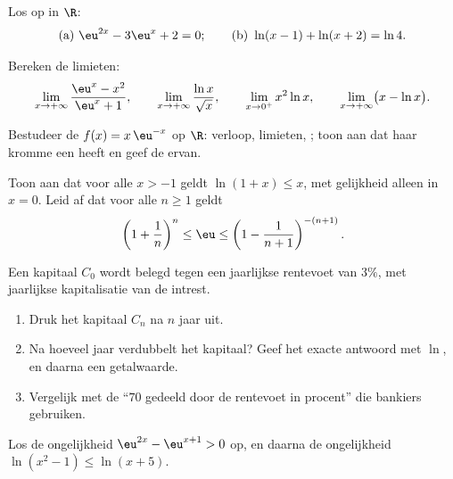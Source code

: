 \begin{exercise}[$\star$]\label{exo:g12:exp:2}
Los op in $\R$:
\[
\text{(a) } \eu^{2x} - 3\eu^{x} + 2 = 0;
\qquad
\text{(b) } \ln(x - 1) + \ln(x + 2) = \ln 4 .
\]
\end{exercise}

\begin{exercise}[$\star$]\label{exo:g12:exp:3}
Bereken de limieten:
\[
\lim_{x\to+\infty} \frac{\eu^x - x^2}{\eu^x + 1}, \qquad
\lim_{x\to+\infty} \frac{\ln x}{\sqrt x}, \qquad
\lim_{x\to0^+} x^2 \ln x, \qquad
\lim_{x\to+\infty} \bigl(x - \ln x\bigr).
\]
\end{exercise}

\begin{exercise}[$\star\star$]\label{exo:g12:exp:4}
Bestudeer de  $f(x) = x\,\eu^{-x}$ op $\R$: verloop, limieten,
; toon aan dat haar kromme een  heeft en geef de 
ervan.
\end{exercise}

\begin{exercise}[$\star\star$]\label{exo:g12:exp:5}
Toon aan dat voor alle $x > -1$ geldt $\ln(1 + x) \leq x$, met gelijkheid
alleen in $x = 0$. Leid af dat voor alle $n \geq 1$ geldt
\[
\left(1 + \frac{1}{n}\right)^n \leq \eu \leq \left(1 - \frac{1}{n+1}\right)^{-(n+1)} .
\]
\end{exercise}

\begin{exercise}[$\star\star$]\label{exo:g12:exp:6}
Een kapitaal $C_0$ wordt belegd tegen een jaarlijkse rentevoet van $3\%$, met
jaarlijkse kapitalisatie van de intrest.
\begin{enumerate}
  \item Druk het kapitaal $C_n$ na $n$ jaar uit.
  \item Na hoeveel jaar verdubbelt het kapitaal? Geef het exacte antwoord met
        $\ln$, en daarna een getalwaarde.
  \item Vergelijk met de  ``$70$ gedeeld door de rentevoet in
        procent'' die bankiers gebruiken.
\end{enumerate}
\end{exercise}

\begin{exercise}[$\star\star$]\label{exo:g12:exp:7}
Los de ongelijkheid $\eu^{2x} - \eu^{x+1} > 0$ op, en daarna de ongelijkheid
$\ln(x^2 - 1) \leq \ln(x + 5)$.
\end{exercise}

